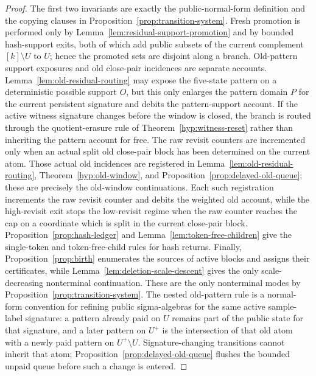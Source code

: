 \documentclass[11pt]{article}
\begin{document}
\begin{proof}
The first two invariants are exactly the public-normal-form definition and the
copying clauses in Proposition~\ref{prop:transition-system}.  Fresh promotion
is performed only by Lemma~\ref{lem:residual-support-promotion} and by bounded
hash-support exits, both of which add public subsets of the current complement
$[k]\setminus U$ to $U$; hence the promoted sets are disjoint along a branch.
Old-pattern support exposures and old close-pair incidences are separate
accounts.  Lemma~\ref{lem:old-residual-routing} may expose the five-state
pattern on a deterministic possible support $O$, but this only enlarges the
pattern domain $P$ for the current persistent signature and debits the pattern-support
account.  If the active witness signature changes before the window is closed,
the branch is routed through the quotient-erasure rule of
Theorem~\ref{hyp:witness-reset} rather than inheriting the pattern account for
free.  The raw revisit counters are incremented only when
an actual split old close-pair block has been determined on the current atom.  Those actual
old incidences are registered in Lemma~\ref{lem:old-residual-routing},
Theorem~\ref{hyp:old-window}, and Proposition~\ref{prop:delayed-old-queue};
these are precisely the old-window continuations.  Each such registration
increments the raw revisit counter and debits the weighted old account, while
the high-revisit exit stops the low-revisit regime when the raw counter reaches
the cap on a coordinate which is split in the current close-pair block.
Proposition~\ref{prop:hash-ledger} and Lemma~\ref{lem:token-free-children}
give the single-token and token-free-child rules for hash returns.  Finally,
Proposition~\ref{prop:birth} enumerates the sources of
active blocks and assigns their certificates, while
Lemma~\ref{lem:deletion-scale-descent} gives the only scale-decreasing
nonterminal continuation.  These are the only nonterminal modes by
Proposition~\ref{prop:transition-system}.  The nested old-pattern rule is a
normal-form convention for refining public sigma-algebras for the same active
sample-label signature: a pattern already paid on $U$ remains part of the public
state for that signature, and a later pattern on $U^+$ is the intersection of
that old atom with a newly paid pattern on $U^+\setminus U$.  Signature-changing
transitions cannot inherit that atom; Proposition~\ref{prop:delayed-old-queue}
flushes the bounded unpaid queue before such a change is entered.
\end{proof}
\end{document}
